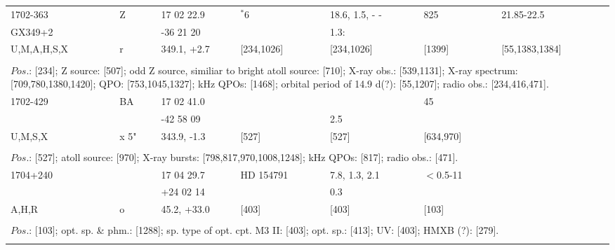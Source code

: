 \documentclass{aa}
\begin{document}
\begin{tabular}{p{2.5cm}p{1cm}p{1.8cm}p{2.3cm}p{3.3cm}p{2.0cm}p{2.2cm}}
\noalign{\smallskip}
1702-363         & Z           & 17 02 22.9           & $^*$6               & 18.6, 1.5, - -         & 825         & 21.85-22.5             \\
GX349+2         &              & -36 21 20             &                           & 1.3:                       &                 &                                 \\
U,M,A,H,S,X   & r            & 349.1, +2.7          & [234,1026]      & [234,1026]           & [1399]    & [55,1383,1384]      \\
\\
\multicolumn{7}{p{17.5cm}}{
$Pos$.: [234]; Z source: [507]; odd Z source, similiar to bright atoll source: [710]; X-ray obs.: [539,1131]; X-ray 
spectrum: [709,780,1380,1420]; QPO: [753,1045,1327]; kHz QPOs: [1468]; orbital period of 14.9 d(?): [55,1207]; 
radio obs.: [234,416,471].}\\
\noalign{\smallskip}
\hline

\noalign{\smallskip}
1702-429        & BA         & 17 02 41.0         &                    &                        & 45                &          \\
                         &                & -42 58 09           &                    & 2.5                 &                      &    \\
U,M,S,X          & x 5"        & 343.9, -1.3        & [527]          & [527]              & [634,970]    &         \\
\\
\multicolumn{7}{p{17.5cm}}{
$Pos$.: [527]; atoll source: [970]; X-ray bursts: [798,817,970,1008,1248]; kHz QPOs: [817]; radio obs.: [471].}\\
\noalign{\smallskip}
\hline

\noalign{\smallskip}
1704+240        &              & 17 04 29.7           & HD 154791     & 7.8, 1.3, 2.1       & $<$0.5-11   &           \\
                          &              & +24 02 14            &                           & 0.3                      &                     &               \\
A,H,R               & o           & 45.2, +33.0          & [403]                & [403]                   & [103]           &         \\
\\
\multicolumn{7}{p{17.5cm}}{
$Pos$.: [103]; opt. sp. \& phm.: [1288]; sp. type of opt. cpt. M3 II: [403]; opt. sp.: [413]; UV: [403]; HMXB (?): [279].}\\
\noalign{\smallskip}
\hline


\end{tabular}
\end{document}

